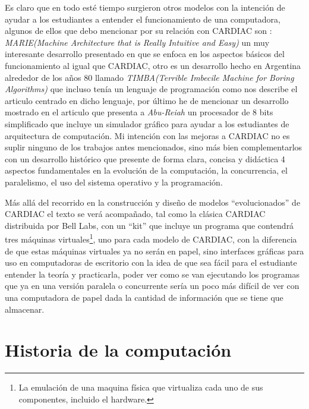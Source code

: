 \documentclass[letterpaper,12pt,oneside]{book}
\begin{document}
	Es claro que en todo esté tiempo surgieron otros modelos con la intención de ayudar a los estudiantes a entender el funcionamiento de una computadora, algunos
	de ellos que debo mencionar por su relación con CARDIAC son : \textit{MARIE(Machine Architecture that is Really Intuitive and Easy)} un muy interesante 
	desarrollo presentado en \cite{null_essentials_2003} que se enfoca en los aspectos básicos del funcionamiento al igual que CARDIAC, otro es un desarrollo
	hecho en Argentina alrededor de los años 80 llamado \textit{TIMBA(Terrible Imbecile Machine for Boring Algorithms)} que incluso tenía un lenguaje de programación
	como nos describe el articulo \cite{alvaro_frias_retruco_2022} centrado en dicho lenguaje, por último he de mencionar un desarrollo
	mostrado en el articulo \cite{ajdari_design_2012} que presenta a \textit{Abu-Reiah} un procesador de 8 bits simplificado que incluye un simulador 
	gráfico
	para ayudar a los estudiantes de arquitectura de computación. Mi intención con las mejoras a CARDIAC no es suplir ninguno de los trabajos antes mencionados,
	sino más bien complementarlos con un desarrollo histórico que presente de forma clara, concisa y didáctica 4 aspectos fundamentales en la evolución
	de la computación, la concurrencia, el paralelismo, el uso del sistema operativo y la programación.
	
	
	Más allá del recorrido en la construcción y diseño de modelos ``evolucionados'' de CARDIAC el texto se verá acompañado,
	tal como la clásica CARDIAC distribuida por Bell Labs, con un ``kit'' que incluye un programa que contendrá tres máquinas virtuales\footnote{La emulación de una
	maquina física que virtualiza cada uno de sus componentes, incluido el hardware.}, uno para cada
	modelo de CARDIAC, con la diferencia de que estas máquinas virtuales ya no serán en papel, sino interfaces gráficas para uso en computadoras de escritorio con la idea de 
	que sea fácil para el estudiante
	entender la teoría y practicarla, poder ver como se van ejecutando los programas que ya en una versión paralela o concurrente sería un poco más difícil de ver con una 
	computadora de papel dada la cantidad de información que se tiene que almacenar.
	


\tableofcontents
\listoffigures

\mainmatter

\chapter{Historia de la computación} 
\end{document}

